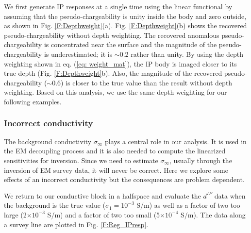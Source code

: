 \documentclass[extra,mreferee]{gji}
\newcommand{\siginf}{\sigma_\infty}
\newcommand{\dip}{d^{IP}}
\begin{document}
We first generate IP responses at a single time using the linear functional by assuming that the pseudo-chargeability is unity inside the body and zero outside, as shown in  Fig. \ref{F:Depthweight}(a). 
Fig. \ref{F:Depthweight}(b) shows the recovered pseudo-chargeability without depth weighting. 
The recovered anomalous pseudo-chargeability is concentrated  near the surface and the magnitude of the pseudo-chargeability is underestimated; it is $\sim$0.2 rather than unity. 
By using the depth weighting shown in eq. (\ref{eq: weight_mat}),  the IP body is imaged closer to its true depth (Fig. \ref{F:Depthweight}b). 
Also, the magnitude of the recovered pseudo-chargeability ($\sim$0.6) is closer to the true value than the result without depth weighting. 
Based on this analysis, we use the same depth weighting for our  following examples. 

\subsubsection{Incorrect conductivity}
The background conductivity $\siginf$ plays a central role in our analysis. It is used in the EM decoupling process and it is also needed to compute the linearized sensitivities for inversion. Since we need to estimate $\siginf$, usually through the inversion of EM survey data, it will never be correct. Here we explore some effects of an incorrect conductivity but  the consequences are problem dependent.

We return to our conductive block in a halfspace and evaluate the $\dip$ data when the background is the true value ($\sigma_1 = 10^{-3}$ S/m) as well as a factor of two too large (2$\times10^{-3}$ S/m) and a factor of two too small (5$\times10^{-4}$ S/m). The data along a survey line are plotted in Fig. \ref{F:Reg_IPresp}.
\end{document}
